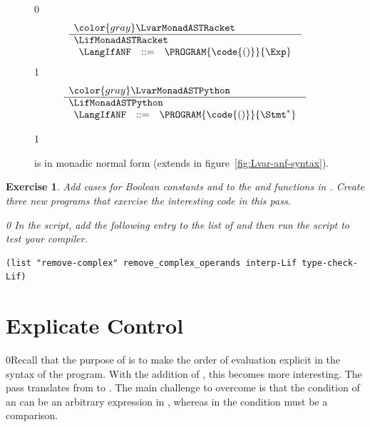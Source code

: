 \documentclass[7x10]{TimesAPriori_MIT}%
\newcommand{\gray}[1]{{\color{gray} #1}}
\def\racketEd{0}
\def\pythonEd{1}
\def\edition{1}
\newcommand{\racket}[1]{{\if\edition\racketEd{#1}\fi}}
\newcommand{\pythonColor}[0]{}
\newcommand{\python}[1]{{\if\edition\pythonEd\pythonColor #1\fi}}
\newtheorem{exercise}[theorem]{Exercise}
\numberwithin{theorem}{chapter}
\numberwithin{definition}{chapter}
\numberwithin{equation}{chapter}
\begin{document}
\begin{figure}[tp]
\centering
\begin{tcolorbox}[colback=white]
{\if\edition\racketEd    
\[
\begin{array}{l}
  \gray{\LvarMonadASTRacket} \\ \hline
  \LifMonadASTRacket \\
\begin{array}{rcl}
\LangIfANF  &::=& \PROGRAM{\code{()}}{\Exp}
\end{array}
\end{array}
\]
\fi}
{\if\edition\pythonEd\pythonColor
\[
\begin{array}{l}
  \gray{\LvarMonadASTPython} \\ \hline
  \LifMonadASTPython \\
   \begin{array}{rcl}
     \LangIfANF  &::=& \PROGRAM{\code{()}}{\Stmt^{*}}
   \end{array}
\end{array}
\]
\fi}
\end{tcolorbox}
\python{}
\caption{\LangIfANF{} is \LangIf{} in monadic normal form
  (extends \LangVarANF in figure~\ref{fig:Lvar-anf-syntax}).}
\label{fig:Lif-anf-syntax}
\end{figure}


\begin{exercise}\normalfont\normalsize
%
Add cases for Boolean constants and  to the 
and  functions in .
%
Create three new \LangIf{} programs that exercise the interesting
code in this pass.
%
{\if\edition\racketEd    
In the  script, add the following entry to the
list of  and then run the script to test your compiler.
\begin{lstlisting}
(list "remove-complex" remove_complex_operands interp-Lif type-check-Lif)
\end{lstlisting}
\fi}
\end{exercise}


\section{Explicate Control}
\label{sec:explicate-control-Lif}

\racket{Recall that the purpose of  is to
  make the order of evaluation explicit in the syntax of the program.
  With the addition of \key{if}, this becomes more interesting.}
%
The  pass translates from \LangIf{} to \LangCIf{}.
%
The main challenge to overcome is that the condition of an 
can be an arbitrary expression in \LangIf{}, whereas in \LangCIf{} the
condition must be a comparison.
\end{document}
